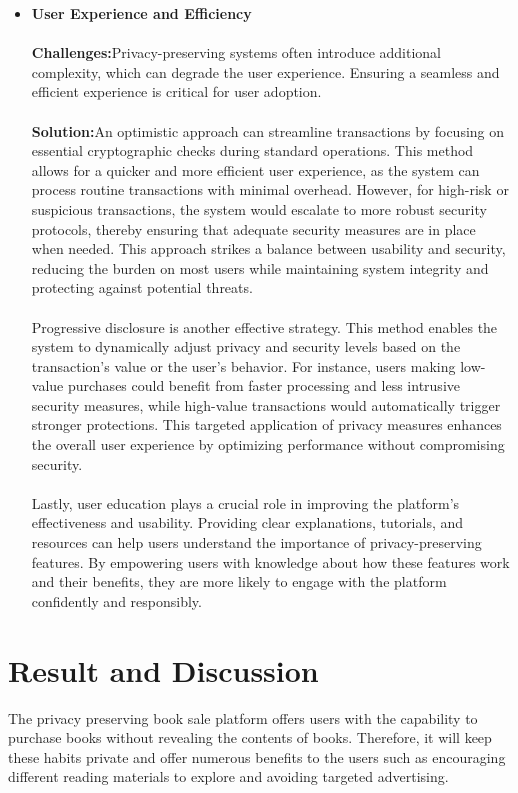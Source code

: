 \documentclass[12pt]{article}
\begin{document}
\begin{itemize}
   \item \textbf{User Experience and Efficiency}\\\\
   \textbf{Challenges:}Privacy-preserving systems often introduce additional complexity, which can degrade the user experience. Ensuring a seamless and efficient experience is critical for user adoption.\\\\
   \textbf{Solution:}An optimistic approach can streamline transactions by focusing on essential cryptographic checks during standard operations. This method allows for a quicker and more efficient user experience, as the system can process routine transactions with minimal overhead. However, for high-risk or suspicious transactions, the system would escalate to more robust security protocols, thereby ensuring that adequate security measures are in place when needed. This approach strikes a balance between usability and security, reducing the burden on most users while maintaining system integrity and protecting against potential threats.\\\\
   Progressive disclosure is another effective strategy. This method enables the system to dynamically adjust privacy and security levels based on the transaction's value or the user's behavior. For instance, users making low-value purchases could benefit from faster processing and less intrusive security measures, while high-value transactions would automatically trigger stronger protections. This targeted application of privacy measures enhances the overall user experience by optimizing performance without compromising security.\\\\
   Lastly, user education plays a crucial role in improving the platform's effectiveness and usability. Providing clear explanations, tutorials, and resources can help users understand the importance of privacy-preserving features. By empowering users with knowledge about how these features work and their benefits, they are more likely to engage with the platform confidently and responsibly.
\end{itemize}
\pagebreak

\section{Result and Discussion}
The privacy preserving book sale platform offers users with the capability to purchase
books without revealing the contents of books. Therefore, it will keep these habits private and offer numerous benefits to the users such as encouraging different reading materials to explore and avoiding targeted advertising. \\
\end{document}
